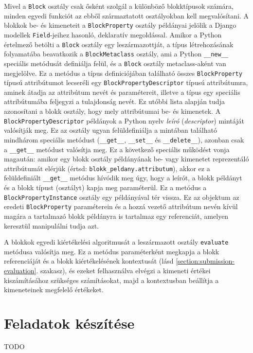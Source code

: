 Mivel a \texttt{Block} osztály csak ősként szolgál a különböző blokktípusok számára, minden egyedi funkciót az ebből származtatott osztályokban kell megvalósítani.
A blokkok be- és kimeneteit a \texttt{Block\-Property} osztály példányai jelölik a Django modellek \texttt{Field}-jeihez hasonló, deklaratív megoldással.
Amikor a Python értelmező betölti a \texttt{Block} osztály egy leszármazottját, a típus létrehozásának folyamatába beavatkozik a \texttt{Block\-Metaclass} osztály, ami a Python \texttt{\_\_new\_\_} speciális metódusát definiálja felül, és a \texttt{Block} osztály meta\-class-aként van megjelölve. \cite{PythonMetaclass}
Ez a metódus a típus definiciójában található összes \texttt{Block\-Property} típusú attribútumot lecseréli egy \texttt{Block\-Property\-Descriptor} típusú attribútumra, aminek átadja az attribútum nevét és paramétereit, illetve a típus egy speciális attribútumába feljegyzi a tulajdonság nevét.
Ez utóbbi lista alapján tudja azonosítani a blokk osztály, hogy mely attribútumai be- és kimenetek.
A \texttt{Block\-Property\-Descriptor} példányok a Python nyelv \textit{leíró} (\textit{descriptor}) mintáját valósítják meg.
Ez az osztály ugyan felüldefiniálja a mintában található mindhárom speciális metódust (\texttt{\_\_get\_\_}, \texttt{\_\_set\_\_} és \texttt{\_\_delete\_\_}), azonban csak a \texttt{\_\_get\_\_} metódust valósítja meg.
Ez a következő speciális működést vonja magaután: amikor egy blokk osztály példányának be- vagy kimenetet reprezentáló attribútumát elérjük (értsd: \texttt{blokk\_peldany.attributum}), akkor ez a felüldefiniált \texttt{\_\_get\_\_} metódus hívódik meg úgy, hogy a leírót, a blokk példányt és a blokk típust (osztályt) kapja meg paraméterül. \cite{PythonDescriptors}
Ez a metódus a \texttt{Block\-Property\-Instance} osztály egy példányával tér vissza.
Ez az objektum az eredeti \texttt{Block\-Property} paraméterein és a hozzá vezető attribútum nevén kívül magára a tartalmazó blokk példányra is tartalmaz egy referenciát, amelyen keresztül manipulálni tudja azt.

A blokkok egyedi kiértékelési algoritmusát a leszármazott osztály \texttt{evaluate} metódusa valósítja meg.
Ez a metódus paraméterként megkapja a blokk referenciáját és a blokk kiértékelésének kontextusát (lásd \ref{section:submission-evaluation}. szakasz), és ezeket felhasználva elvégzi a kimeneti értékei kiszámításához szükséges számításokat, majd a kontextusban beállítja a kimeneteinek megfelelő értékeket.

\section{Feladatok készítése}
TODO

